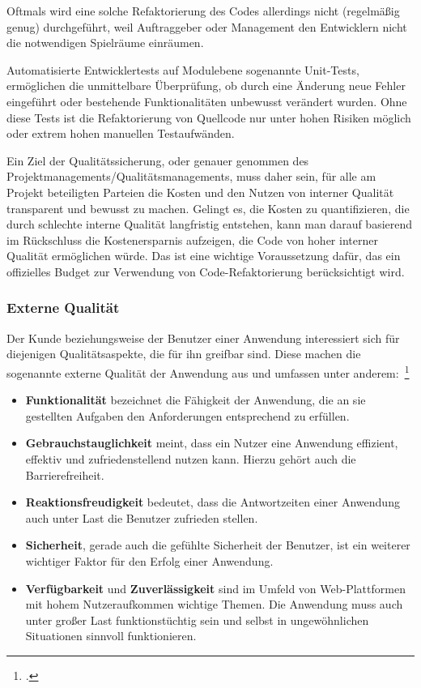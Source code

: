 Oftmals wird eine solche Refaktorierung des Codes allerdings nicht (regelmäßig genug) durchgeführt, weil Auftraggeber oder Management den Entwicklern nicht die notwendigen Spielräume einräumen.

Automatisierte Entwicklertests auf Modulebene sogenannte Unit-Tests, ermöglichen die unmittelbare Überprüfung, ob durch eine Änderung neue Fehler eingeführt oder bestehende Funktionalitäten unbewusst verändert wurden. Ohne diese Tests ist die Refaktorierung von Quellcode nur unter hohen Risiken möglich oder extrem hohen manuellen Testaufwänden.

Ein Ziel der Qualitätssicherung, oder genauer genommen des Projektmanagements/Qualitätsmanagements, muss daher sein, für alle am Projekt beteiligten Parteien die Kosten und den Nutzen von interner Qualität transparent und bewusst zu machen. Gelingt es, die Kosten zu quantifizieren, die durch schlechte interne Qualität langfristig entstehen, kann man darauf basierend im Rückschluss die Kostenersparnis aufzeigen, die Code von hoher interner Qualität ermöglichen würde. Das ist eine wichtige Voraussetzung dafür, das ein offizielles Budget zur Verwendung von Code-Refaktorierung berücksichtigt wird.

\subsubsection{Externe Qualität}
Der Kunde beziehungsweise der Benutzer einer Anwendung interessiert sich für diejenigen Qualitätsaspekte, die für ihn greifbar sind. Diese machen die sogenannte externe Qualität
der Anwendung aus und umfassen unter anderem:~\footcite[Vgl. Seite 5]{Bergmann.2013}
\begin{itemize}
    \item \textbf{Funktionalität} bezeichnet die Fähigkeit der Anwendung, die an sie gestellten Aufgaben den Anforderungen entsprechend zu erfüllen.
    
    \item \textbf{Gebrauchstauglichkeit} meint, dass ein Nutzer eine Anwendung effizient, effektiv und zufriedenstellend nutzen kann. Hierzu gehört auch die Barrierefreiheit.

    \item \textbf{Reaktionsfreudigkeit} bedeutet, dass die Antwortzeiten einer Anwendung auch unter Last die Benutzer zufrieden stellen. 

    \item \textbf{Sicherheit}, gerade auch die gefühlte Sicherheit der Benutzer, ist ein weiterer wichtiger Faktor für den Erfolg einer Anwendung.

    \item \textbf{Verfügbarkeit} und \textbf{Zuverlässigkeit} sind im Umfeld von Web-Plattformen mit hohem Nutzeraufkommen wichtige Themen. Die Anwendung muss auch unter großer Last funktionstüchtig sein und selbst in ungewöhnlichen Situationen sinnvoll funktionieren.
\end{itemize}

